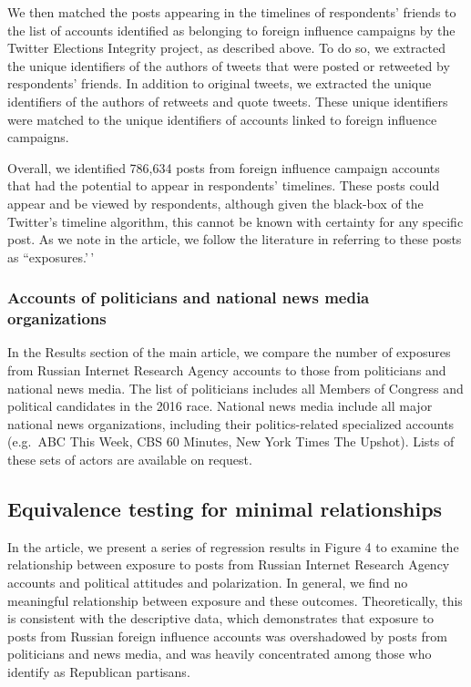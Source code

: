 \documentclass[
  12pt,
]{article}
\begin{document}
We then matched the posts appearing in the timelines of respondents' friends to the list of accounts identified as belonging to foreign influence campaigns by the Twitter Elections Integrity project, as described above. To do so, we extracted the unique identifiers of the authors of tweets that were posted or retweeted by respondents' friends. In addition to original tweets, we extracted the unique identifiers of the authors of retweets and quote tweets. These unique identifiers were matched to the unique identifiers of accounts linked to foreign influence campaigns.

Overall, we identified 786,634 posts from foreign influence campaign accounts that had the potential to appear in respondents' timelines. These posts could appear and be viewed by respondents, although given the black-box of the Twitter's timeline algorithm, this cannot be known with certainty for any specific post. As we note in the article, we follow the literature \citep[e.g.][]{Grinberg2019} in referring to these posts as ``exposures.'\,'

\hypertarget{accounts-of-politicians-and-national-news-media-organizations}{%
\subsubsection{Accounts of politicians and national news media organizations}\label{accounts-of-politicians-and-national-news-media-organizations}}

In the Results section of the main article, we compare the number of exposures from Russian Internet Research Agency accounts to those from politicians and national news media. The list of politicians includes all Members of Congress and political candidates in the 2016 race. National news media include all major national news organizations, including their politics-related specialized accounts (e.g.~ABC This Week, CBS 60 Minutes, New York Times The Upshot). Lists of these sets of actors are available on request.

\clearpage

\hypertarget{equivalence-testing-for-minimal-relationships}{%
\subsection{Equivalence testing for minimal relationships}\label{equivalence-testing-for-minimal-relationships}}

In the article, we present a series of regression results in Figure 4 to examine the relationship between exposure to posts from Russian Internet Research Agency accounts and political attitudes and polarization. In general, we find no meaningful relationship between exposure and these outcomes. Theoretically, this is consistent with the descriptive data, which demonstrates that exposure to posts from Russian foreign influence accounts was overshadowed by posts from politicians and news media, and was heavily concentrated among those who identify as Republican partisans.
\end{document}
